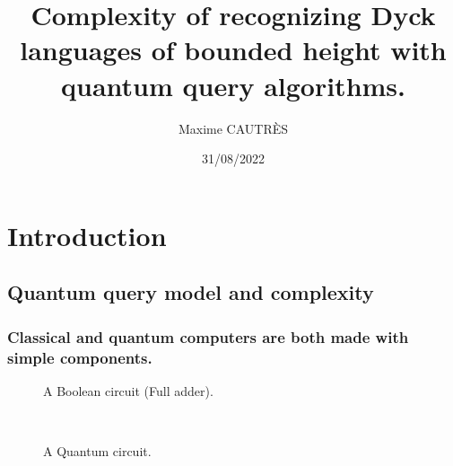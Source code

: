 \documentclass[9pt, notheorems]{beamer}
\title[QQC of bounded height Dyck languages.]{{\huge Complexity of recognizing Dyck languages
of bounded height with quantum query algorithms.}}
\author{Maxime CAUTRÈS}
\institute{Faculty of Computing\\ University of Latvia}
\date{31/08/2022}
\renewcommand{\comment}[1]{}
\theoremstyle{definition}
\theoremstyle{plain}
\theoremstyle{definition}
\begin{document}
\begin{frame}
    \titlepage
\end{frame}

\section{Introduction}

\comment{}
\subsection{Quantum query model and complexity}

\begin{frame}
    \frametitle{Classical and quantum computers are both made with simple components.}
    \begin{minipage}{.45\textwidth}
        \begin{figure}
            
            \caption{A Boolean circuit (Full adder).}
        \end{figure}
    \end{minipage}
    \hfill
    \begin{minipage}{.45\textwidth}
        \begin{figure}
            \vspace*{.5cm}
            \\[.8cm]
            \caption{A Quantum circuit.}
        \end{figure}
    \end{minipage}
\end{frame}
\end{document}
